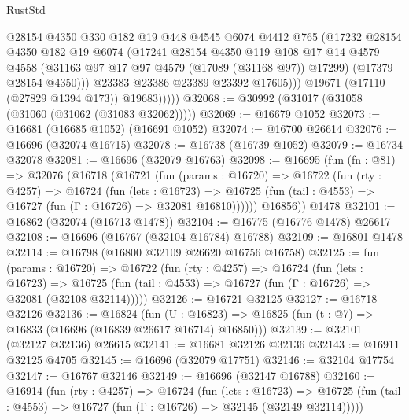 \begin{lexlean}{RustStd}
\begin{coremodule}
                    @28154
                    @4350
                    @330
                    @182
                    @19
                    @448
                    @4545
                    @6074
                    @4412
                    @765
                    (@17232
                      @28154
                      @4350
                      @182
                      @19
                      @6074
                      (@17241
                        @28154
                        @4350
                        @119
                        @108
                        @17
                        @14
                        @4579
                        @4558
                        (@31163 @97 @17 @97 @4579 (@17089 (@31168 @97)) @17299)
                        (@17379 @28154 @4350)))
                    @23383
                    @23386
                    @23389
                    @23392
                    @17605)))
              @19671
              (@17110 (@27829 @1394 @173))
              @19683)))))
@32068 := @30992 (@31017 (@31058 (@31060 (@31062 (@31083 @32062)))))
@32069 := @16679 @1052
@32073 := @16681 (@16685 @1052) (@16691 @1052)
@32074 := @16700 @26614
@32076 := @16696 (@32074 @16715)
@32078 := @16738 (@16739 @1052)
@32079 := @16734 @32078
@32081 := @16696 (@32079 @16763)
@32098 := @16695
    (fun (fn : @81) =>
    @32076
      (@16718
        (@16721
          (fun (params : @16720) =>
          @16722
            (fun (rty : @4257) =>
            @16724
              (fun (lets : @16723) =>
              @16725 (fun (tail : @4553) => @16727 (fun (Γ : @16726) => @32081 @16810))))))
        @16856))
    @1478
@32101 := @16862 (@32074 (@16713 @1478))
@32104 := @16775 (@16776 @1478) @26617
@32108 := @16696 (@16767 (@32104 @16784) @16788)
@32109 := @16801 @1478
@32114 := @16798 (@16800 @32109 @26620 @16756 @16758)
@32125 := fun (params : @16720) =>
  @16722
    (fun (rty : @4257) =>
    @16724
      (fun (lets : @16723) =>
      @16725 (fun (tail : @4553) => @16727 (fun (Γ : @16726) => @32081 (@32108 @32114)))))
@32126 := @16721 @32125
@32127 := @16718 @32126
@32136 := @16824
    (fun (U : @16823) => @16825 (fun (t : @7) => @16833 (@16696 (@16839 @26617 @16714) @16850)))
@32139 := @32101 (@32127 @32136) @26615
@32141 := @16681 @32126 @32136
@32143 := @16911 @32125 @4705
@32145 := @16696 (@32079 @17751)
@32146 := @32104 @17754
@32147 := @16767 @32146
@32149 := @16696 (@32147 @16788)
@32160 := @16914
    (fun (rty : @4257) =>
    @16724
      (fun (lets : @16723) =>
      @16725 (fun (tail : @4553) => @16727 (fun (Γ : @16726) => @32145 (@32149 @32114)))))

\end{coremodule}
\end{lexlean}
